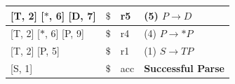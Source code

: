 \documentclass[fleqn]{article}
\begin{document}
\begin{enumerate}
\begin{tabular}{| l | r | l | l |}
  \hline
  [(start), 0] [T, 2] [$*$, 6] [D, 7]                                   & $\$$                                 & r5    & (5) $P \rightarrow D$             \\
  \hline
  [(start), 0] [T, 2] [$*$, 6] [P, 9]                                   & $\$$                                 & r4    & (4) $P \rightarrow * P$           \\
  \hline
  [(start), 0] [T, 2] [P, 5]                                            & $\$$                                 & r1    & (1) $S \rightarrow T P$           \\
  \hline   
  [(start), 0] [S, 1]                                                   & $\$$                                 & acc   & \textbf{Successful Parse}         \\
  \hline
  \end{tabular}

\end{enumerate}
\end{document}

